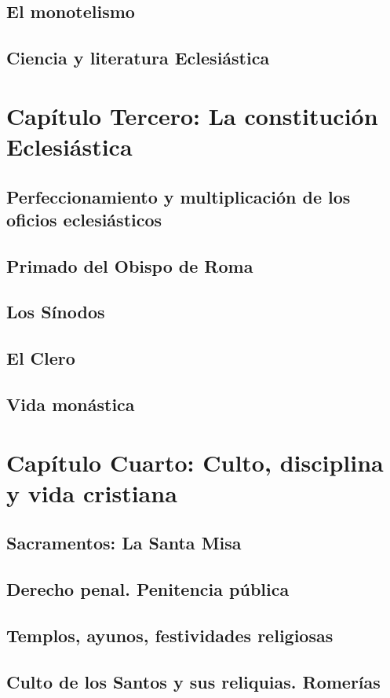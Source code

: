 \raggedbottom{} \documentclass[12pt, a4paper, openany]{book} %
\begin{document}
\section{El monotelismo}
\section{Ciencia y literatura Eclesiástica}
\chapter{Capítulo Tercero: La constitución Eclesiástica}
\section{Perfeccionamiento y multiplicación de los oficios eclesiásticos}
\section{Primado del Obispo de Roma}
\section{Los Sínodos}
\section{El Clero}
\section{Vida monástica}
\chapter{Capítulo Cuarto: Culto, disciplina y vida cristiana}
\section{Sacramentos: La Santa Misa}
\section{Derecho penal. Penitencia pública}
\section{Templos, ayunos, festividades religiosas}
\section{Culto de los Santos y sus reliquias. Romerías}
\end{document}
